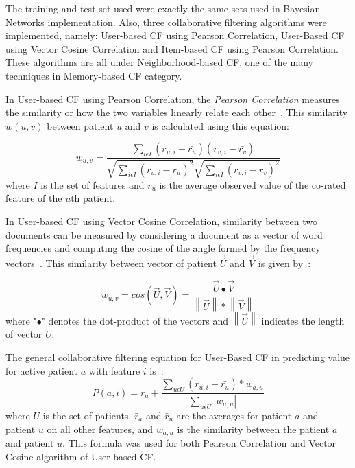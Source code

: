 \documentclass[journal]{./IEEE/IEEEtran}
\begin{document}
	The training and test set used were exactly the same sets used in Bayesian Networks implementation. Also, three collaborative filtering algorithms were implemented, namely:  User-based CF using Pearson Correlation, User-Based CF using Vector Cosine Correlation and Item-based CF using Pearson Correlation. These algorithms are all under Neighborhood-based CF, one of the many techniques in Memory-based CF category.

	In User-based CF using Pearson Correlation, the {\it Pearson Correlation} measures the similarity or how the two variables linearly relate each other~\cite{Su09}. This similarity $w(u,v)$ between patient $u$ and $v$ is calculated using this equation:

\begin{equation}
w_{u,v} = \frac{\sum_{i\epsilon I}(r_{u,i}-\bar{r_{u}})(r_{v,i}-\bar{r_{v}})}{\sqrt{\sum_{i\epsilon I}(r_{u,i}-\bar{r_{u}})^{2}}\sqrt{\sum_{i\epsilon I}(r_{v,i}-\bar{r_{v}})^{2}}}
\end{equation}
where $I$ is the set of features and $\bar{r_{u}}$ is the average observed value of the co-rated feature of the $u$th patient.

	In User-based CF using Vector Cosine Correlation, similarity between two documents can be measured by considering a document as a vector of word frequencies and computing the cosine of the angle formed by the frequency vectors~\cite{Macskassy08}. This similarity between vector of patient $\vec{U}$ and $\vec{ V}$ is given by~\cite{Su09}:
 
\begin{equation}
w_{u,v} = cos(\vec{U},\vec{V})= \frac{\vec{U}\bullet\vec{V}}{\left \|\vec {U}\right \|*\left \|\vec {V}\right \|}
\end{equation}
where "$\bullet$" denotes the dot-product of the vectors and $\left \|\vec {U}\right \|$ indicates the length of vector $U$.

	The general collaborative filtering equation for User-Based CF in predicting value for active patient $a$ with feature $i$ is~\cite{Su09}:
\begin{equation}
\label{eqn_example}
P(a,i)=\bar{r_a}+ \frac{\sum _{u\epsilon U}(r_{u,i}-\bar {r_u})*w_{a,u}}{\sum_{u\epsilon U} \left | w_{a,u} \right |}
\end{equation}
where $U$ is the set of patients, $\bar r_a$ and $\bar r_u$ are the averages for patient $a$ and patient $u$ on all other features, and $w_{a,u}$ is the similarity between the patient $a$ and patient $u$. This formula was used for both Pearson Correlation and Vector Cosine algorithm of User-based CF.
\end{document}
